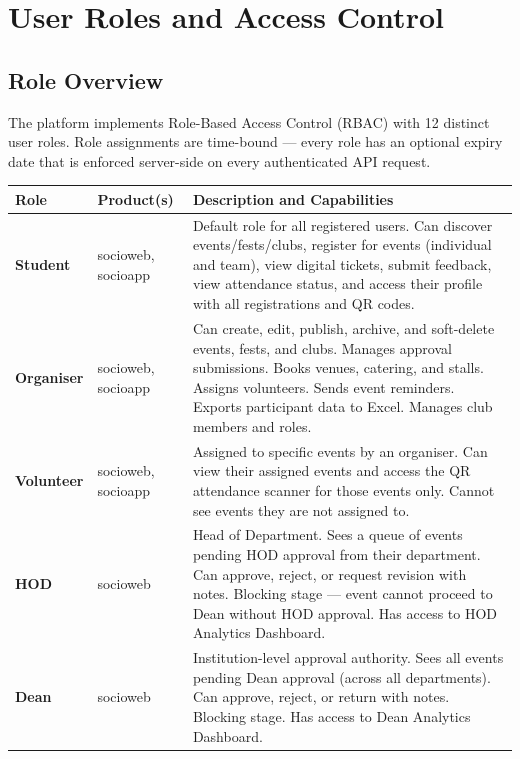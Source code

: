 \documentclass[12pt,a4paper]{article}
\begin{document}
\newpage
\section{User Roles and Access Control}

\subsection{Role Overview}

The platform implements Role-Based Access Control (RBAC) with 12 distinct user roles. Role assignments are time-bound — every role has an optional expiry date that is enforced server-side on every authenticated API request.

\begin{longtable}{L{3.5cm} L{2.5cm} X}
\toprule
{}
\textbf{Role} & \textbf{Product(s)} & \textbf{Description and Capabilities} \\
\midrule
\endhead
\textbf{Student} & socioweb, socioapp & Default role for all registered users. Can discover events/fests/clubs, register for events (individual and team), view digital tickets, submit feedback, view attendance status, and access their profile with all registrations and QR codes. \\
\addlinespace
\textbf{Organiser} & socioweb, socioapp & Can create, edit, publish, archive, and soft-delete events, fests, and clubs. Manages approval submissions. Books venues, catering, and stalls. Assigns volunteers. Sends event reminders. Exports participant data to Excel. Manages club members and roles. \\
\addlinespace
\textbf{Volunteer} & socioweb, socioapp & Assigned to specific events by an organiser. Can view their assigned events and access the QR attendance scanner for those events only. Cannot see events they are not assigned to. \\
\addlinespace
\textbf{HOD} & socioweb & Head of Department. Sees a queue of events pending HOD approval from their department. Can approve, reject, or request revision with notes. Blocking stage — event cannot proceed to Dean without HOD approval. Has access to HOD Analytics Dashboard. \\
\addlinespace
\textbf{Dean} & socioweb & Institution-level approval authority. Sees all events pending Dean approval (across all departments). Can approve, reject, or return with notes. Blocking stage. Has access to Dean Analytics Dashboard. \\

\end{longtable}
\end{document}

